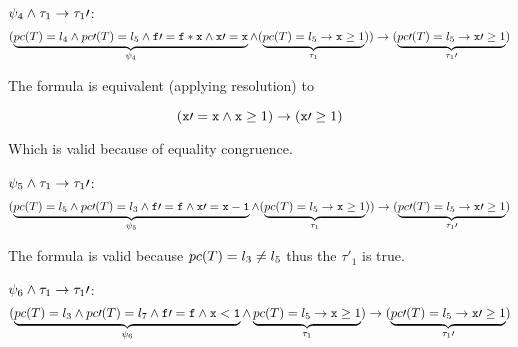 	 \;$\psi_4 \wedge \tau_1 \to \tau_1\prime $: 
	\begin{equation*}
		(
			\underbrace{pc(T) = l_4 \wedge pc\prime (T) = l_5 \wedge \mathtt{f}\prime  = \mathtt{f*x} \wedge \mathtt{x\prime =x}}_{\psi_4} \wedge (\underbrace{pc(T) = l_5 \to \mathtt{x}\geq 1}_{\tau_1})
		) 
			\to(\underbrace{pc\prime (T) = l_5 \to \mathtt{x}\prime  \geq 1}_{\tau_1\prime })\\\\
	\end{equation*}

	The formula is equivalent (applying resolution) to

	\begin{equation*}
		(
			\mathtt{x\prime =x} \wedge  \mathtt{x}\geq 1
		) 
		\to (\mathtt{x}\prime \geq 1)
	\end{equation*}


	Which is valid because of equality congruence.

	 $\psi_5 \wedge \tau_1 \to \tau_1\prime $:
	\begin{equation*}
		(
			\underbrace{pc(T) = l_5 \wedge pc\prime (T) = l_3 \wedge \mathtt{f\prime =f} \wedge \mathtt{x\prime =x-1}}_{\psi_5} \wedge (\underbrace{pc(T) = l_5 \to \mathtt{x}\geq 1}_{\tau_1})
		) 
			\to(\underbrace{pc\prime (T) = l_5 \to \mathtt{x}\prime  \geq 1}_{\tau_1\prime })\\\\
	\end{equation*}


	The formula is valid because $pc(T) = l_3 \neq l_5$ thus the $\tau\prime _1$ is true.

	 $\psi_6 \wedge \tau_1 \to \tau_1\prime $:
	\begin{equation*}
		(
			\underbrace{pc(T) = l_3 \wedge pc\prime (T) = l_7 \wedge \mathtt{f\prime =f} \wedge \mathtt{x<1}}_{\psi_6} \wedge \underbrace{pc(T) = l_5 \to \mathtt{x} \geq 1}_{\tau_1}
		) 
			\to (\underbrace{pc\prime (T) = l_5 \to \mathtt{x}\prime  \geq 1}_{\tau_1\prime })\\\\
	\end{equation*}


